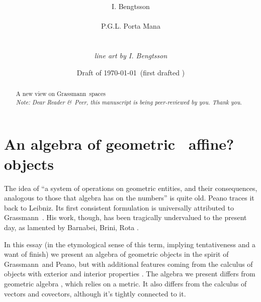 \documentclass[\ifafour a4paper,12pt,\else a5paper,10pt,\fi%
onecolumn,oneside,article,%
british%
]{memoir}
\title{\propertitle%
}
\author{%
\hspace*{\stretch{1}}%
\parbox{0.5\linewidth}%
{\protect\centering I. Bengtsson\\%
\footnotesize\epost{\email{ingemar}{fysik.su.se}}}%
\hspace*{\stretch{1}}%
\parbox{0.5\linewidth}%
{\protect\centering P.G.L.  Porta Mana\\%
\footnotesize\epost{\email{piero.mana}{ntnu.no}}}%
\hspace*{\stretch{1}}%
\\[2\jot] {\footnotesize\textnormal{\emph{line art by I. Bengtsson}}}%
}
\date{Draft of \today\ (first drafted \firstdraft)}
\theoremstyle{remark}
\theoremstyle{innote}
\newcommand*{\citep}{\parencites}
\newcommand*{\citey}{\parencites*}
\newcommand*{\amp}{\&}
\newcommand*{\asudedication}[1]{%
{\par\centering\textit{#1}\par}}
\renewcommand*{\|}{\nonscript\,\vert\nonscript\;\mathopen{}}
\newcommand*{\sect}{\S}%
\newcommand*{\puzzle}{{\fontencoding{U}\fontfamily{fontawesometwo}\selectfont\symbol{225}}}
\newcommand{\mynote}[1]{ {\color{notecolour}\puzzle\ #1}}
\newcommand*{\gm}{Grassmann}
\begin{document}
\captiondelim{\quad}\captionnamefont{\footnotesize}\captiontitlefont{\footnotesize}
\frenchspacing

\maketitle
\abstractrunin
\abslabeldelim{}
\renewcommand*{\abstractname}{}
\setlength{\absleftindent}{0pt}
\setlength{\absrightindent}{0pt}
\setlength{\abstitleskip}{-\absparindent}
\begin{abstract}%
  \noindent A new view on \gm\ spaces
\\\noindent\emph{\footnotesize Note: Dear Reader
    \amp\ Peer, this manuscript is being peer-reviewed by you. Thank you.}
\end{abstract}

\frenchspacing


\section{An algebra of geometric \mynote{affine?} objects}
\label{sec:algebra_geometry}

The idea of \enquote{a system of operations on geometric entities, and
  their consequences, analogous to those that algebra has on the numbers}
\citep[Preface]{peano1888_t2000} is quite old. Peano traces it back to
Leibniz. Its first consistent formulation is universally attributed to \gm\
\citey{grassmann1844_r1878,grassmann1862}. His work, though, has been
tragically undervalued to the present day, as lamented by Barnabei, Brini,
Rota \citey[\sect~1]{barnabeietal1985}.

In this essay (in the etymological sense of this term, implying
tentativeness and a want of finish) we present an algebra of geometric
objects in the spirit of \gm\ and Peano, but with additional features
coming from the calculus of objects with exterior and interior properties
\citep{veblenetal1932,schoutenetal1940,schouten1951_r1989,burke1983,burke1985_r1987,burke1995,bossavit1994_r2002,bossavit2003b}.
The algebra we present differs from geometric algebra
\citep{dorstetal2007,li2008}, which relies on a metric. It also differs
from the calculus of vectors and covectors, although it's tightly connected
to it.
\end{document}
